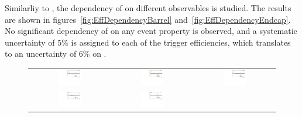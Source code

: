 Similarliy to \rmue, the dependency of \rt on different observables is studied.
The results are shown in figures~\ref{fig:EffDependencyBarrel} and~\ref{fig:EffDependencyEndcap}.
No significant dependency of \rt on any event property is observed,
and a systematic uncertainty of 5\% is assigned to each of the trigger efficiencies,
which translates to an uncertainty of 6\% on \rt.

\begin{figure}[htb]
  \begin{center}
    \begin{tabular}{ccc}
      \includegraphics[width=0.30\textwidth]{bkgd/figs/Triggereff_SFvsOF_Syst_PFHT_HighHTExclusiveCentral_Run2015_25ns_NJets_None_NonIso_MC.pdf} &
      \includegraphics[width=0.30\textwidth]{bkgd/figs/Triggereff_SFvsOF_Syst_PFHT_HighHTExclusiveCentral_Run2015_25ns_nVtx_None_NonIso_MC.pdf}  &
      \includegraphics[width=0.30\textwidth]{bkgd/figs/Triggereff_SFvsOF_Syst_PFHT_HighHTExclusiveCentral_Run2015_25ns_TrailingPt_None_NonIso_MC.pdf} \\
      \includegraphics[width=0.30\textwidth]{bkgd/figs/Triggereff_SFvsOF_Syst_PFHT_HighHTExclusiveCentral_Run2015_25ns_Mll_None_NonIso_MC.pdf} &
      \includegraphics[width=0.30\textwidth]{bkgd/figs/Triggereff_SFvsOF_Syst_PFHT_HighHTExclusiveCentral_Run2015_25ns_MET_None_NonIso_MC.pdf} &

\end{tabular}
\end{center}
\end{figure}
